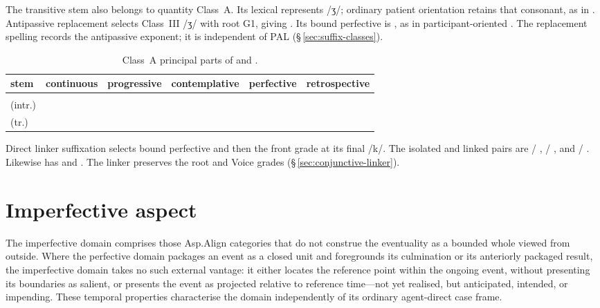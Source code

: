 The transitive stem   also belongs to quantity
Class~A. Its lexical  represents /ʒ/; ordinary patient orientation
retains that consonant, as in .
Antipassive replacement selects Class~III /ʒ/ with root G1, giving
. Its bound perfective is
, as in participant-oriented .
The replacement spelling  records the antipassive exponent;
it is independent of PAL (§\,\ref{sec:suffix-classes}).

\begin{table}[htbp]
\footnotesize
\caption{Class~A principal parts of  and .}
\label{tab:read-sing-principal-parts}
\begin{tabularx}{\textwidth}{L L L L L L}
\toprule
{\sc stem} & {\sc continuous} & {\sc progressive} & {\sc contemplative} & {\sc perfective} & {\sc retrospective} \\
\midrule
{} &  &  &  &  &  \\
 (intr.) &  &  &  &  &  \\
 (tr.) &  &  &  &  &  \\
\bottomrule
\end{tabularx}
\end{table}

Direct linker suffixation selects bound perfective  and then
the front grade at its final /k/. The isolated and linked pairs are
 / ,
 / ,
and  / .
Likewise  has
 and
.
The linker preserves the root and Voice grades
(§\,\ref{sec:conjunctive-linker}).

\section{Imperfective aspect}
\label{sec:aspect-ipf}

The imperfective domain comprises those Asp.Align categories that do not
construe the eventuality as a bounded whole viewed from outside. Where the
perfective domain packages an event as a closed unit and foregrounds its
culmination or its anteriorly packaged result, the imperfective domain takes
no such external vantage: it either locates the reference point within the
ongoing event, without presenting its boundaries as salient, or presents the
event as projected relative to reference time---not yet realised, but
anticipated, intended, or impending. These temporal properties characterise
the domain independently of its ordinary agent-direct case frame.

